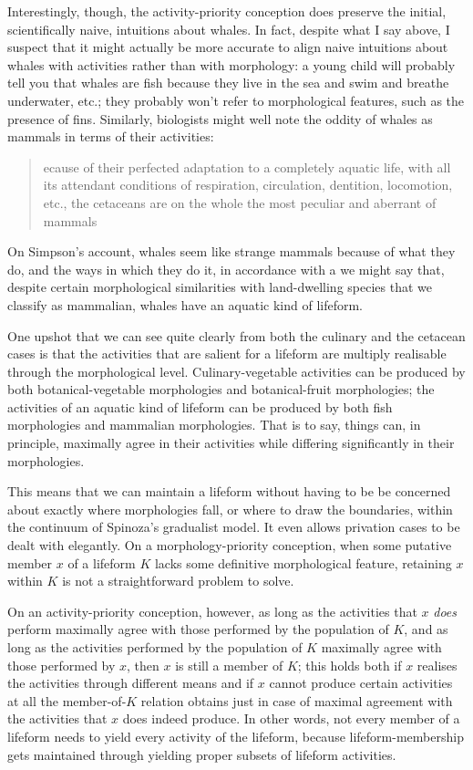 \documentclass{article}
\newcommand{\dash}{\unskip{—}}
\begin{document}
Interestingly, though, the activity-priority conception does preserve the initial, scientifically naive, intuitions about whales. In fact, despite what I say above, I suspect that it might actually be more accurate to align naive intuitions about whales with activities rather than with morphology: a young child will probably tell you that whales are fish because they live in the sea and swim and breathe underwater, etc.; they probably won't refer to morphological features, such as the presence of fins. Similarly, biologists might well note the oddity of whales as mammals in terms of their activities:
{
  \blockcquote[213]{Simpson:1945}[.]{ecause of their perfected adaptation to a completely aquatic life, with all its attendant conditions of respiration, circulation, dentition, locomotion, etc., the cetaceans are on the whole the most peculiar and aberrant of mammals}
}
On Simpson's account, whales seem like strange mammals because of what they do, and the ways in which they do it, in accordance with a  \dash we might say that, despite certain morphological similarities with land-dwelling species that we classify as mammalian, whales have an aquatic kind of lifeform.

One upshot that we can see quite clearly from both the culinary and the cetacean cases is that the activities that are salient for a lifeform are multiply realisable through the morphological level. Culinary-vegetable activities can be produced by both botanical-vegetable morphologies and botanical-fruit morphologies; the activities of an aquatic kind of lifeform can be produced by both fish morphologies and mammalian morphologies. That is to say, things can, in principle, maximally agree in their activities while differing significantly in their morphologies.

This means that we can maintain a lifeform without having to be be concerned about exactly where morphologies fall, or where to draw the boundaries, within the continuum of Spinoza's gradualist model. It even allows privation cases to be dealt with elegantly. On a morphology-priority conception, when some putative member $x$ of a lifeform $K$ lacks some definitive morphological feature, retaining $x$ within $K$ is not a straightforward problem to solve.

On an activity-priority conception, however, as long as the activities that $x$ \emph{does} perform maximally agree with those performed by the population of $K$, and as long as the activities performed by the population of $K$ maximally agree with those performed by $x$, then $x$ is still a member of $K$; this holds both if $x$ realises the activities through different means and if $x$ cannot produce certain activities at all \dash the member-of-$K$ relation obtains just in case of maximal agreement with the activities that $x$ does indeed produce. In other words, not every member of a lifeform needs to yield every activity of the lifeform, because lifeform-membership gets maintained through yielding proper subsets of lifeform activities.
\end{document}
